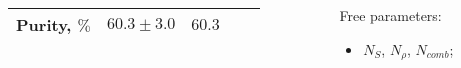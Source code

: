 \documentclass[10 pt,compress,mathserif]{beamer}
\begin{document}
\begin{frame}
{\begin{columns}
\begin{column}{0.7\textwidth}
\begin{table}[bt]
\begin{tabular}{|l|c|c|c|c|}
Purity, $\%$ & $60.3 \pm 3.0$ & $60.3$&               &        \\ \hline
 \end{tabular}
 \end{table}
  \end{column}
  \begin{column}{0.3\textwidth}
   Free parameters:
   \begin{itemize}
    \item $N_S$, $N_{\rho}$, $N_{comb}$;
   \end{itemize}
  \end{column}
 \end{columns}
 }
\end{frame}

\setcounter{framenumber}{\value{finalframe}}
\end{document}
